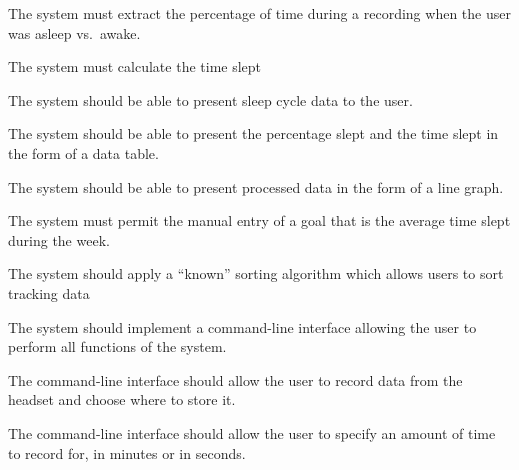 \begin{reqtable}
  {The system must extract the percentage of time during a recording when the user was asleep vs.\
    awake.}
  \phigh
  \deps{\ref{sreq:calculate-moving-average}}

  {The system must calculate the time slept}
  \phigh
  \deps{\ref{sreq:calculate-moving-average}}

  {The system should be able to present sleep cycle data to the user.}
  \phigh
  \deps{\ref{sreq:present-data-table},\ref{sreq:present-hypnogram}}

  {The system should be able to present the percentage slept and the time slept in the form of a data table.}
  \phigh
  \deps{\ref{req:extract-data}}

  {The system should be able to present processed data in the form of a line graph.}
  \phigh
  \deps{\ref{req:extract-data}}

  {The system must permit the manual entry of a goal that is the average time slept during the week.}
  \pmed
  \dnone


  {The system should apply a ``known'' sorting algorithm which allows users to sort tracking data}
  \pmed
  \deps{\ref{req:store-data}}
  \sspec

  {The system should implement a command-line interface allowing the user to perform all functions
    of the system.}
  \phigh
  \deps{\ref{sreq:allow-user-record-data}, \ref{sreq:specify-time-record},
    \ref{sreq:allow-user-change-format}, \ref{sreq:allow-user-extract-calculate},
    \ref{sreq:cli-sort-display}}

  {The command-line interface should allow the user to record data from the headset and choose where
    to store it.}
  \phigh
  \deps{\ref{sreq:read-data-headset}, \ref{sreq:facilitate-saving}}
  \smin{13}

  {The command-line interface should allow the user to specify an amount of time to record for, in
    minutes or in seconds.}
  \phigh
  \deps{\ref{sreq:allow-user-record-data}}


\end{reqtable}

